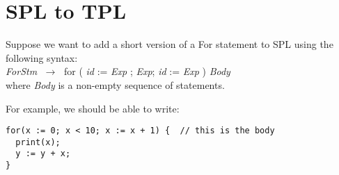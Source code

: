 \documentclass{article}
\newcommand{\regla}[1]{$\;\mathbf{\stackrel{{}_{#1}}{\longrightarrow}}\;$}
\begin{document}
\section{SPL to TPL}

Suppose we want to add a short version of a For statement to SPL using the following syntax: \\ 
 
\textit{ForStm} \regla{}  for ( \textit{id} := \textit{Exp} ; \textit{Exp}; \textit{id } := \textit{Exp} )  \textit{Body} \\

where \textit{Body} is a non-empty sequence of statements.

For example, we should be able to write:
\begin{verbatim}
for(x := 0; x < 10; x := x + 1) {  // this is the body
  print(x);
  y := y + x;
}
\end{verbatim}
\end{document}
